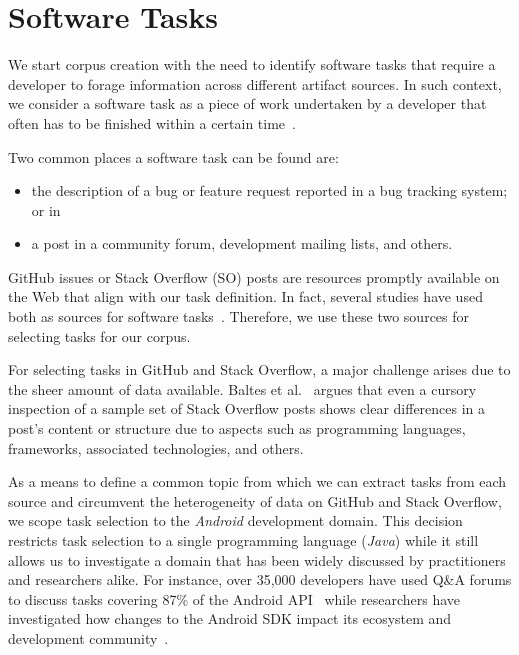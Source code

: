 \section{Software Tasks}
\label{cp4:corpus-tasks}


We start corpus creation with the need to identify software tasks that require
a developer to forage information across different artifact sources. 
In such context, we consider a software task as a piece of work undertaken by a developer that often has to be finished within a certain time~\cite{2004merriam}.


Two common places a software task can be found are:

\begin{itemize}
    \item the description of a bug or feature request reported in a bug tracking system; or in
    \item a post in a community forum, development mailing lists, and others.
\end{itemize}

GitHub issues or Stack Overflow (SO) posts are resources promptly available on the Web that align with our task definition.
In fact, several studies have used both as sources for software tasks~\cite{Arya2019, baltes2019, nadi2020, Xu2017}. Therefore, we use these two sources for selecting tasks for our corpus.



For selecting tasks in GitHub and Stack Overflow, a major challenge arises due to the sheer amount of data available.
Baltes et al.~\cite{baltes2019} argues that even a cursory inspection of a sample set
of Stack Overflow posts shows clear differences in a post's content or structure due to aspects such as programming languages, frameworks, associated technologies, and others.

As a means to define a common topic from which we can extract tasks from each source
and circumvent the heterogeneity of data on GitHub and Stack Overflow, we scope task selection to the \textit{Android} development domain. This decision
restricts task selection to a single programming language (\textit{Java})
while it still allows us to investigate a domain that has been
widely discussed by practitioners and researchers alike.
For instance, over 35,000 developers have used Q\&A forums to discuss tasks covering 87\% of the Android API~\cite{parnin2012}
while researchers have investigated how changes to the Android SDK impact its ecosystem and development community~\cite{linares2014, bavota2014b, mcdonnell2013}.


